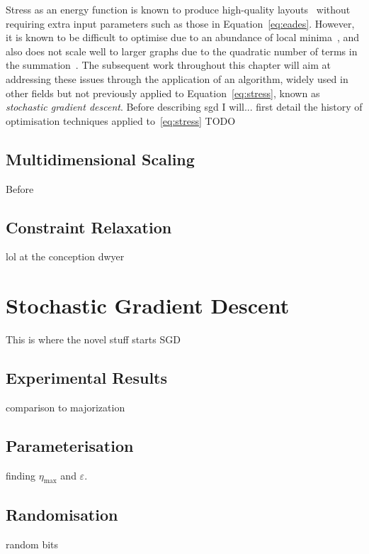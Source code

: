 Stress as an energy function is known to produce high-quality layouts~\cite{brandes_review, TODO} without requiring extra input parameters such as those in Equation~\eqref{eq:eades}. However, it is known to be difficult to optimise due to an abundance of local minima~\cite{onedimensionalmds, hu}, and also does not scale well to larger graphs due to the quadratic number of terms in the summation~\cite{brandes_review, hu}.
The subsequent work throughout this chapter will aim at addressing these issues through the application of an algorithm, widely used in other fields but not previously applied to Equation~\ref{eq:stress}, known as \emph{stochastic gradient descent}.
Before describing sgd I will... first detail the history of optimisation techniques applied to~\eqref{eq:stress}
TODO


\subsection{Multidimensional Scaling}
\label{sec:stress_background}
Before 

\subsection{Constraint Relaxation}
\label{sec:wcr}
lol at the conception
dwyer

\section{Stochastic Gradient Descent}
\label{sec:sgd}
This is where the novel stuff starts SGD

\subsection{Experimental Results}
comparison to majorization

\subsection{Parameterisation}
finding $\eta_{\max}$ and $\varepsilon$.

\subsection{Randomisation}
random bits

